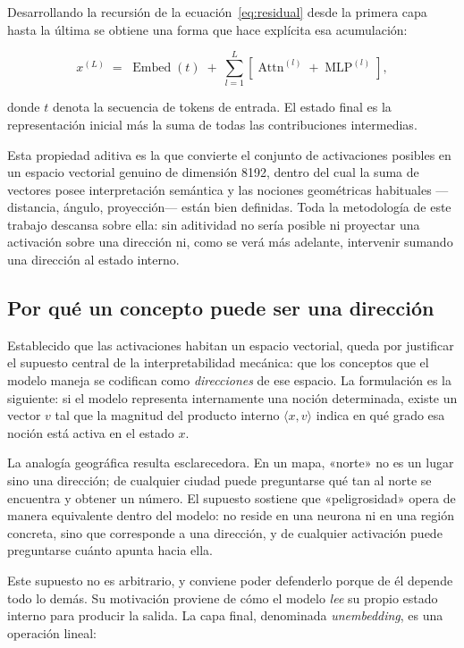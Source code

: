Desarrollando la recursión de la ecuación~\eqref{eq:residual} desde la primera
capa hasta la última se obtiene una forma que hace explícita esa acumulación:

\begin{equation}
  x^{(L)} \;=\; \operatorname{Embed}(t)
  \;+\; \sum_{l=1}^{L}\left[\operatorname{Attn}^{(l)} + \operatorname{MLP}^{(l)}\right],
  \label{eq:residual-desarrollado}
\end{equation}

\noindent
donde $t$ denota la secuencia de tokens de entrada. El estado final es la
representación inicial más la suma de todas las contribuciones intermedias.

Esta propiedad aditiva es la que convierte el conjunto de activaciones posibles
en un espacio vectorial genuino de dimensión 8192, dentro del cual la suma de
vectores posee interpretación semántica y las nociones geométricas habituales
—distancia, ángulo, proyección— están bien definidas. Toda la metodología de
este trabajo descansa sobre ella: sin aditividad no sería posible ni proyectar
una activación sobre una dirección ni, como se verá más adelante, intervenir
sumando una dirección al estado interno.

\subsection{Por qué un concepto puede ser una dirección}

Establecido que las activaciones habitan un espacio vectorial, queda por
justificar el supuesto central de la interpretabilidad mecánica: que los
conceptos que el modelo maneja se codifican como \textit{direcciones} de ese
espacio. La formulación es la siguiente: si el modelo representa internamente
una noción determinada, existe un vector $v$ tal que la magnitud del producto
interno $\langle x, v\rangle$ indica en qué grado esa noción está activa en el
estado $x$.

La analogía geográfica resulta esclarecedora. En un mapa, «norte» no es un
lugar sino una dirección; de cualquier ciudad puede preguntarse qué tan al
norte se encuentra y obtener un número. El supuesto sostiene que «peligrosidad»
opera de manera equivalente dentro del modelo: no reside en una neurona ni en
una región concreta, sino que corresponde a una dirección, y de cualquier
activación puede preguntarse cuánto apunta hacia ella.

Este supuesto no es arbitrario, y conviene poder defenderlo porque de él
depende todo lo demás. Su motivación proviene de cómo el modelo \textit{lee} su
propio estado interno para producir la salida. La capa final, denominada
\textit{unembedding}, es una operación lineal:

